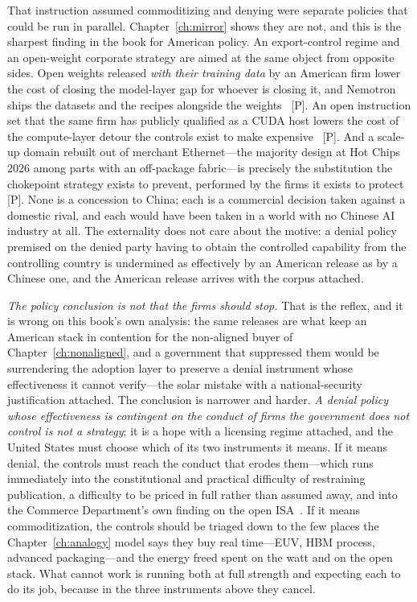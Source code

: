 That instruction assumed commoditizing and denying were separate policies that could be run in parallel. Chapter~\ref{ch:mirror} shows they are not, and this is the sharpest finding in the book for American policy. An export-control regime and an open-weight corporate strategy are aimed at the same object from opposite sides. Open weights released \emph{with their training data} by an American firm lower the cost of closing the model-layer gap for whoever is closing it, and Nemotron ships the datasets and the recipes alongside the weights~\cite{nemotron} [P]. An open instruction set that the same firm has publicly qualified as a CUDA host lowers the cost of the compute-layer detour the controls exist to make expensive~\cite{hc2026-nv-riscv,cuda-riscv} [P]. And a scale-up domain rebuilt out of merchant Ethernet---the majority design at Hot Chips 2026 among parts with an off-package fabric---is precisely the substitution the chokepoint strategy exists to prevent, performed by the firms it exists to protect~\cite{hc2026-scaleup} [P]. None is a concession to China; each is a commercial decision taken against a domestic rival, and each would have been taken in a world with no Chinese AI industry at all. The externality does not care about the motive: a denial policy premised on the denied party having to obtain the controlled capability from the controlling country is undermined as effectively by an American release as by a Chinese one, and the American release arrives with the corpus attached.

\emph{The policy conclusion is not that the firms should stop.} That is the reflex, and it is wrong on this book's own analysis: the same releases are what keep an American stack in contention for the non-aligned buyer of Chapter~\ref{ch:nonaligned}, and a government that suppressed them would be surrendering the adoption layer to preserve a denial instrument whose effectiveness it cannot verify---the solar mistake with a national-security justification attached. The conclusion is narrower and harder. \emph{A denial policy whose effectiveness is contingent on the conduct of firms the government does not control is not a strategy}; it is a hope with a licensing regime attached, and the United States must choose which of its two instruments it means. If it means denial, the controls must reach the conduct that erodes them---which runs immediately into the constitutional and practical difficulty of restraining publication, a difficulty to be priced in full rather than assumed away, and into the Commerce Department's own finding on the open ISA~\cite{riscv-restrict}. If it means commoditization, the controls should be triaged down to the few places the Chapter~\ref{ch:analogy} model says they buy real time---EUV, HBM process, advanced packaging---and the energy freed spent on the watt and on the open stack. What cannot work is running both at full strength and expecting each to do its job, because in the three instruments above they cancel.

